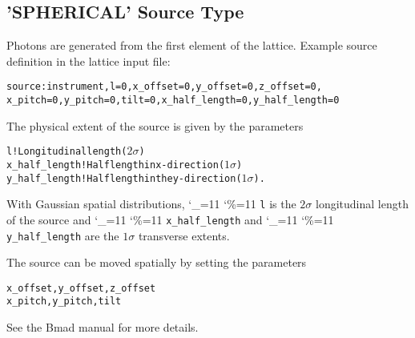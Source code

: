 \documentclass[11pt]{article}
\newcommand\ttcmd{\begingroup\catcode`\_=11 \catcode`\%=11 \dottcmd}
\newcommand\dottcmd[1]{\texttt{#1}\endgroup}
\newcommand{\vn}{\ttcmd}
\newenvironment{example}
  {\vspace{\ExBeg} \begin{alltt}}
  {\end{alltt} \vspace{\ExEnd}}
\newlength{\ExBeg}
\newlength{\ExEnd}
\begin{document}
\subsection{'SPHERICAL' Source Type}

Photons are generated from the first element of the lattice. 
Example source definition in the lattice input file:
\begin{example}
  source: instrument, l = 0, x_offset = 0, y_offset = 0, z_offset = 0,
        x_pitch = 0, y_pitch = 0, tilt = 0, x_half_length = 0, y_half_length = 0
\end{example}
The physical extent of the source is given by the parameters
\begin{example}
  l              ! Longitudinal length (\(2 \sigma\))
  x_half_length  ! Half length in x-direction (\(1 \sigma\))
  y_half_length  ! Half length in the y-direction (\(1 \sigma\)).
\end{example}
With Gaussian spatial distributions, \vn{l} is the $2\sigma$
longitudinal length of the source and \vn{x_half_length} and
\vn{y_half_length} are the $1\sigma$ transverse extents.

The source can be moved spatially by setting the parameters
\begin{example}
  x_offset, y_offset, z_offset
  x_pitch, y_pitch, tilt
\end{example}
See the Bmad manual for more details.
\end{document}
